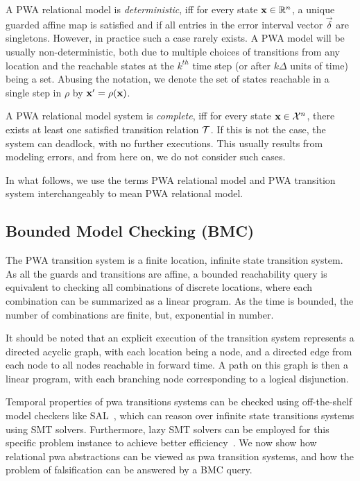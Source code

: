 
A PWA relational model is \textit{deterministic}, iff for every state
$\mathbf{x}\in\mathbb{R}^n$, a unique guarded affine map is satisfied and if all
entries in the error interval vector $\vec{\delta}$ are singletons.
However, in practice such a case rarely exists. A PWA model will be
usually non-deterministic, both due to multiple choices of transitions
from any location and the reachable states at the $k^{th}$ time step
(or after $k\Delta$ units of time) being a set.  Abusing the notation,
we denote the set of states reachable in a single step in $\rho$ by
$\mathbf{x}' = \rho(\mathbf{x})$.

A PWA relational model system is \textit{complete}, iff for every
state $\mathbf{x}\in\mathcal{X}^n$, there exists at least one satisfied
transition relation $\mathcal{T}$. If this is not the case, the system can
deadlock, with no further executions. This usually results from
modeling errors, and from here on, we do not consider such cases.

In what follows, we use the terms PWA relational model and PWA
transition system interchangeably to mean PWA relational model.

\subsection{Bounded Model Checking (BMC)}
The PWA transition system is a finite location, infinite state
transition system. As all the guards and transitions are affine, a
bounded reachability query is equivalent to checking all
combinations of discrete locations, where each combination can be
summarized as a linear program. As the time is bounded, the number of
combinations are finite, but, exponential in number.

It should be noted that an explicit execution of the transition system
represents a directed acyclic graph, with each location being a node,
and a directed edge from each node to all nodes reachable in forward
time. A path on this graph is then a linear program, with each
branching node corresponding to a logical disjunction.

Temporal properties of pwa transitions systems can be checked using
off-the-shelf model checkers like SAL~\cite{SAL-SRI}, which can reason
over infinite state transitions systems using SMT solvers.
Furthermore, lazy SMT solvers can be employed for this specific
problem instance to achieve better efficiency~\cite{shoukry2017smc}.
We now show how relational pwa abstractions can be viewed as pwa
transition systems, and how the problem of falsification can
be answered by a BMC query.

